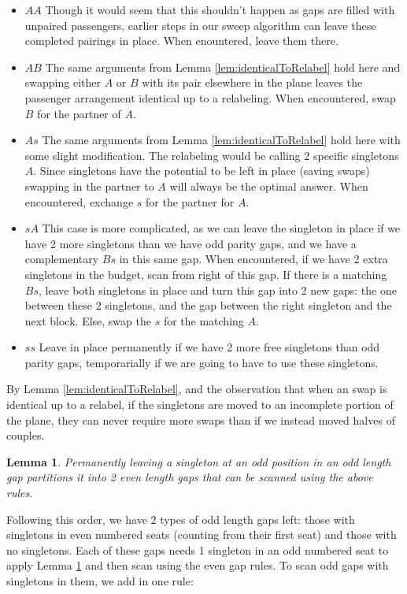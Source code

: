 \documentclass[a4paper]{article}
\newtheorem{lem}{Lemma}[section]
\begin{document}
\begin{itemize}
\item $AA$ 
Though it would seem that this shouldn't happen as gaps are filled with unpaired passengers, earlier steps in our sweep algorithm can leave these completed pairings in place.  When enountered, leave them there.
\item $AB$ 
The same arguments from Lemma \ref{lem:identicalToRelabel} hold here and swapping either $A$ or $B$ with its pair elsewhere in the plane leaves the passenger arrangement identical up to a relabeling.  When encountered, swap $B$ for the partner of $A$.
\item $As$
The same arguments from Lemma \ref{lem:identicalToRelabel} hold here with some slight modification. The relabeling would be calling 2 specific singletons $A$.  Since singletons have the potential to be left in place (saving swaps) swapping in the partner to $A$ will always be the optimal answer.  When encountered, exchange $s$ for the partner for $A$.
\item $sA$ 
This case is more complicated, as we can leave the singleton in place if we have 2 more singletons than we have odd parity gaps, and we have a complementary $Bs$ in this same gap.  When encountered, if we have 2 extra singletons in the budget, scan from right of this gap. If there is a matching $Bs$, leave both singletons in place and turn this gap into 2 new gaps: the one between these 2 singletons, and the gap between the right singleton and the next block.  Else, swap the $s$ for the matching $A$.
\item $ss$ 
Leave in place permanently if we have 2 more free singletons than odd parity gaps, temporarially if we are going to have to use these singletons.
\end{itemize}

By Lemma \ref{lem:identicalToRelabel}, and the observation that when an swap is identical up to a relabel, if the singletons are moved to an incomplete portion of the plane, they can never require more swaps than if we instead moved halves of couples.

\begin{lem} \label{lem:splitOddGaps}
Permanently leaving a singleton at an odd position in an odd length gap partitions it into 2 even length gaps that can be scanned using the above rules.
\end{lem}

Following this order, we have 2 types of odd length gaps left: those with singletons in even numbered seats (counting from their first seat) and those with no singletons.  Each of these gaps needs 1 singleton in an odd numbered seat to apply Lemma \ref{lem:splitOddGaps} and then scan using the even gap rules.  To scan odd gaps with singletons in them, we add in one rule:
\end{document}
